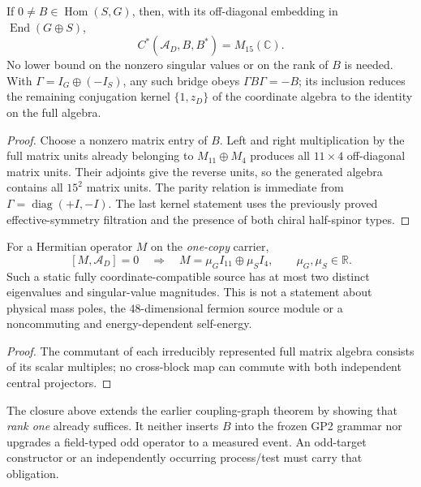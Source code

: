 \documentclass[12pt,a4paper]{article}
\begin{document}
\begin{theorem}
\label{p2c:thm:v352-rankone-full-bridge}
If $0\ne B\in\operatorname{Hom}(S,G)$, then, with its off-diagonal
embedding in $\operatorname{End}(G\oplus S)$,
\[
 \boxed{C^*(\mathcal A_D,B,B^*)=M_{15}(\mathbb C)}.
\]
No lower bound on the nonzero singular values or on the rank of $B$
is needed.  With $\Gamma=I_G\oplus(-I_S)$, any such bridge obeys
$\Gamma B\Gamma=-B$; its inclusion reduces the remaining
conjugation kernel $\{1,z_D\}$ of the coordinate algebra to the
identity on the full algebra.
\end{theorem}
\begin{proof}
Choose a nonzero matrix entry of $B$.  Left and right multiplication
by the full matrix units already belonging to $M_{11}\oplus M_4$
produces all $11\times4$ off-diagonal matrix units.  Their
adjoints give the reverse units, so the generated algebra contains
all $15^2$ matrix units.  The parity relation is immediate from
$\Gamma=\operatorname{diag}(+I,-I)$.  The last kernel statement
uses the previously proved effective-symmetry filtration and the
presence of both chiral half-spinor types.
\end{proof}

\begin{proposition}
\label{p2c:prop:v352-static-source-commutant}
For a Hermitian operator $M$ on the \emph{one-copy} carrier,
\[
 [M,\mathcal A_D]=0\quad\Longrightarrow\quad
 \boxed{M=\mu_G I_{11}\oplus\mu_S I_4},
 \qquad \mu_G,\mu_S\in\mathbb R.
\]
Such a static fully coordinate-compatible source has at most two
distinct eigenvalues and singular-value magnitudes.  This is not a
statement about physical mass poles, the $48$-dimensional fermion
source module or a noncommuting and energy-dependent self-energy.
\end{proposition}
\begin{proof}
The commutant of each irreducibly represented full matrix algebra
consists of its scalar multiples; no cross-block map can commute
with both independent central projectors.
\end{proof}

\begin{remark}
\label{p2c:rem:v352-bridge-licensing}
The closure above extends the earlier coupling-graph theorem by
showing that \emph{rank one} already suffices.  It neither inserts
$B$ into the frozen GP2 grammar nor upgrades a field-typed odd
operator to a measured event.  An odd-target constructor or an
independently occurring process/test must carry that obligation.
\end{remark}
\end{document}
